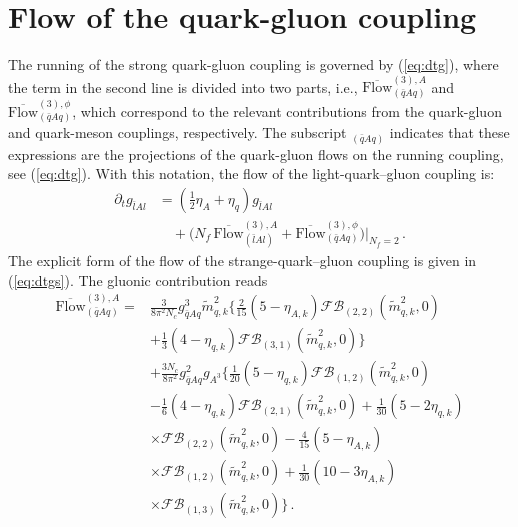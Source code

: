 \documentclass[%
reprint,
superscriptaddress,
showpacs,preprintnumbers,
 amsmath,amssymb,
 aps,
prd,
]{revtex4-1}
\def\eq#1{(\ref{#1})}
\begin{document}
\section{Flow of the quark-gluon coupling}
\label{app:dtqg}
The running of the strong quark-gluon coupling is governed by
\eq{eq:dtg}, where the term in the second line is divided into two
parts, i.e., $ \overline{\textrm{Flow}}^{(3),A}_{(\bar q A q)}$ and
$ \overline{\textrm{Flow}}^{(3),\phi}_{{(\bar q A q)}}$, which
correspond to the relevant contributions from the quark-gluon and
quark-meson couplings, respectively. The subscript
${}_{{(\bar q A q)}}$ indicates that these expressions are the
projections of the quark-gluon flows on the running coupling, see
\eq{eq:dtg}. With this notation, the flow of the light-quark--gluon
coupling is:
  \begin{align} \label{eq:dtglexp} \nonumber \partial_t g_{\bar{l}Al}
    &= \left( \frac12\eta_A+\eta_q\right)
      g_{\bar{l}A l}\\
    &\quad +\bigg( N_f\, \overline{\textrm{Flow}}^{(3),A}_{(\bar l A
      l)} + \overline{\textrm{Flow}}^{(3),\phi}_{{(\bar q A
      q)}}\bigg)\bigg|_{N_f=2}\,.
\end{align}
The explicit form of the flow of the strange-quark--gluon coupling is
given in \eq{eq:dtgs}. The gluonic contribution reads
%
\begin{align}
  \overline{\textrm{Flow}}^{(3),A}_{(\bar q A q)}
  =&\frac{3}{8\pi^2N_c}
     g_{\bar{q}Aq}^{3}\tilde{m}_{q,k}^{2}\bigg
     \{\frac{2}{15}(5-\eta_{A,k})\mathcal{FB}_{(2,2)}(
     \tilde{m}_{q,k}^{2},0)\nonumber \\[1ex] 
   &+\frac{1}{3}(4-\eta_{q,k})\mathcal{FB}_{(3,1)}(
     \tilde{m}_{q,k}^{2},0)\bigg\}\nonumber \\[1ex] 
   &+\frac{3N_c}{8\pi^2}g_{\bar{q}Aq}^{2}g_{A^3}
     \bigg\{\frac{1}{20} (5-\eta_{q,k})
     \mathcal{FB}_{(1,2)}(\tilde{m}_{q,k}^{2},0)\nonumber \\[1ex] 
   &-\frac{1}{6} (4-\eta_{q,k})\mathcal{FB}_{(2,1)}(\tilde{m}_{q,k}^{2},0)+
     \frac{1}{30} (5-2\eta_{q,k})\nonumber \\[1ex] 
   &\times\mathcal{FB}_{(2,2)}(\tilde{m}_{q,k}^{2},0)
     -\frac{4}{15}(5-\eta_{A,k})\nonumber \\[1ex] 
   &\times\mathcal{FB}_{(1,2)}(\tilde{m}_{q,k}^{2},0)
     +\frac{1}{30}(10-3\eta_{A,k})\nonumber \\[1ex] 
   &\times\mathcal{FB}_{(1,3)}(\tilde{m}_{q,k}^{2},0)\bigg\}\,. 
 \label{eq:dtgA}
\end{align}
\end{document}

